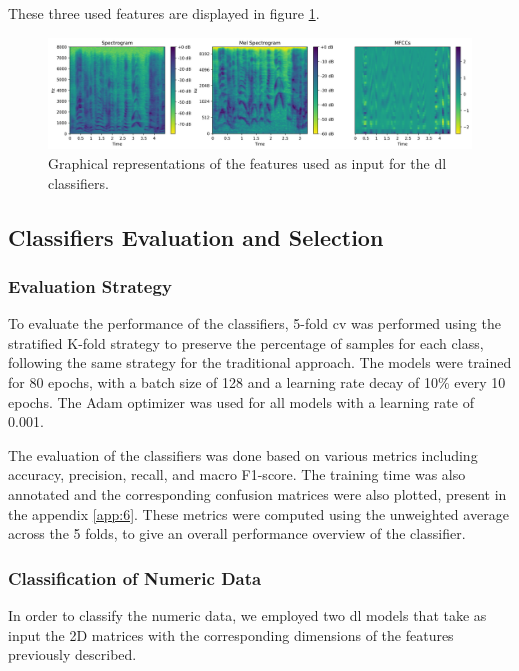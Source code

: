 These three used features are displayed in figure \ref{fig:dl_features}.

\begin{figure}[H]
	\centering
	\includegraphics[width=\textwidth]{figs/4_4_deep_learning/features.png}
	\caption{Graphical representations of the features used as input for the \ac{dl} classifiers.}
	\label{fig:dl_features}
\end{figure}



\subsection{Classifiers Evaluation and Selection}

\subsubsection{Evaluation Strategy}

To evaluate the performance of the classifiers, 5-fold \ac{cv} was performed using the stratified K-fold strategy to preserve the percentage of samples for each class, following the same strategy for the traditional approach. The models were trained for 80 epochs, with a batch size of 128 and a learning rate decay of 10\% every 10 epochs. The Adam optimizer was used for all models with a learning rate of 0.001.

The evaluation of the classifiers was done based on various metrics including accuracy, precision, recall, and macro F1-score. The training time was also annotated and the corresponding confusion matrices were also plotted, present in the appendix \ref{app:6}. These metrics were computed using the unweighted average across the 5 folds, to give an overall performance overview of the classifier.

\subsubsection{Classification of Numeric Data}

In order to classify the numeric data, we employed two \ac{dl} models that take as input the 2D matrices with the corresponding dimensions of the features previously described.

